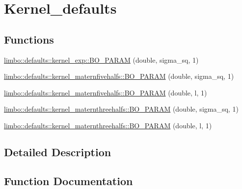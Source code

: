 \hypertarget{group__kernel__defaults}{}\section{Kernel\+\_\+defaults}
\label{group__kernel__defaults}
\subsection*{Functions}
\begin{DoxyCompactItemize}
\item 
\hyperlink{group__kernel__defaults_ga202b52540fa68b47005cd9e3ef61a3fe}{limbo\+::defaults\+::kernel\+\_\+exp\+::\+B\+O\+\_\+\+P\+A\+R\+A\+M} (double, sigma\+\_\+sq, 1)
\item 
\hyperlink{group__kernel__defaults_ga872fb50d6e244a40ff7c65321434b24b}{limbo\+::defaults\+::kernel\+\_\+maternfivehalfs\+::\+B\+O\+\_\+\+P\+A\+R\+A\+M} (double, sigma\+\_\+sq, 1)
\item 
\hyperlink{group__kernel__defaults_gaae66735209158acd497dc5034fa535ff}{limbo\+::defaults\+::kernel\+\_\+maternfivehalfs\+::\+B\+O\+\_\+\+P\+A\+R\+A\+M} (double, l, 1)
\item 
\hyperlink{group__kernel__defaults_ga5cf36a497746c36b6bded9c6fb368ae6}{limbo\+::defaults\+::kernel\+\_\+maternthreehalfs\+::\+B\+O\+\_\+\+P\+A\+R\+A\+M} (double, sigma\+\_\+sq, 1)
\item 
\hyperlink{group__kernel__defaults_ga8764c13406e6fe0ab8f3c79d200c5e96}{limbo\+::defaults\+::kernel\+\_\+maternthreehalfs\+::\+B\+O\+\_\+\+P\+A\+R\+A\+M} (double, l, 1)
\end{DoxyCompactItemize}


\subsection{Detailed Description}


\subsection{Function Documentation}
\hypertarget{group__kernel__defaults_ga202b52540fa68b47005cd9e3ef61a3fe}{}

